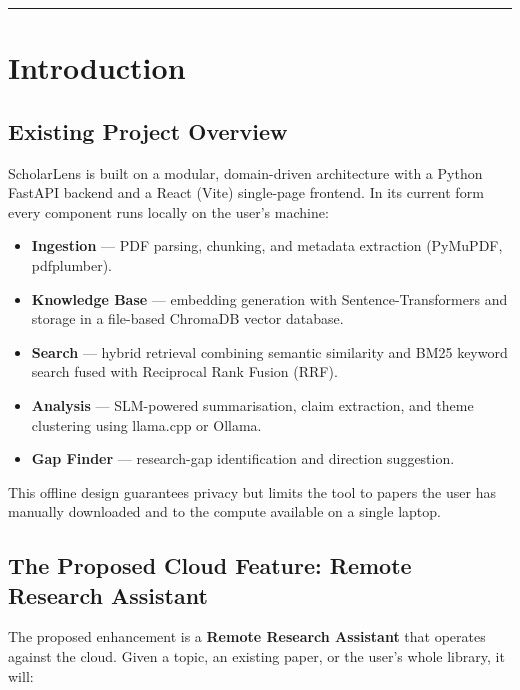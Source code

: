 \documentclass[12pt,a4paper]{article}
\begin{document}
\vspace{0.3cm}
\hrule
\vspace{0.2cm}
\tableofcontents
\newpage

\section{Introduction}

\subsection{Existing Project Overview}
ScholarLens is built on a modular, domain-driven architecture with a Python
FastAPI backend and a React (Vite) single-page frontend. In its current form
every component runs locally on the user's machine:

\begin{itemize}[leftmargin=2em, nosep]
    \item \textbf{Ingestion} --- PDF parsing, chunking, and metadata
          extraction (PyMuPDF, pdfplumber).
    \item \textbf{Knowledge Base} --- embedding generation with
          Sentence-Transformers and storage in a file-based ChromaDB vector
          database.
    \item \textbf{Search} --- hybrid retrieval combining semantic similarity
          and BM25 keyword search fused with Reciprocal Rank Fusion (RRF).
    \item \textbf{Analysis} --- SLM-powered summarisation, claim extraction,
          and theme clustering using llama.cpp or Ollama.
    \item \textbf{Gap Finder} --- research-gap identification and direction
          suggestion.
\end{itemize}

This offline design guarantees privacy but limits the tool to papers the user
has manually downloaded and to the compute available on a single laptop.

\subsection{The Proposed Cloud Feature: Remote Research Assistant}
The proposed enhancement is a \textbf{Remote Research Assistant} that operates
against the cloud. Given a topic, an existing paper, or the user's whole
library, it will:
\end{document}
